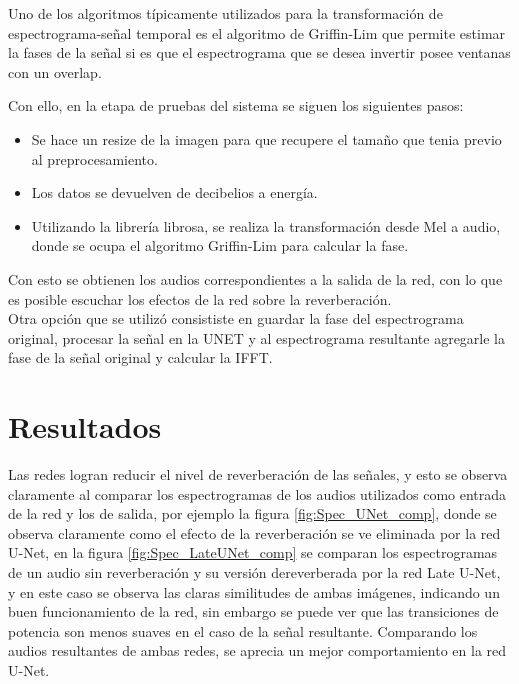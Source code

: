 Uno de los algoritmos típicamente utilizados para la transformación de espectrograma-señal temporal es el algoritmo de Griffin-Lim que permite estimar la fases de la señal si es que el espectrograma que se desea invertir posee ventanas con un overlap.


Con ello, en la etapa de pruebas del sistema se siguen los siguientes pasos:
\begin{itemize}
    \item Se hace un resize de la imagen para que recupere el tamaño que tenia previo al preprocesamiento. 
    \item Los datos se devuelven de decibelios a energía.
    \item Utilizando la librería librosa, se realiza la transformación desde Mel a audio, donde se ocupa el algoritmo Griffin-Lim para calcular la fase.
\end{itemize}

Con esto se obtienen los audios correspondientes a la salida de la red, con lo que es posible escuchar los efectos de la red sobre la reverberación.\\


Otra opción que se utilizó consististe en guardar la fase del espectrograma original, procesar la señal en la UNET y al espectrograma resultante agregarle la fase de la señal original y calcular la IFFT.



\section{Resultados}
Las redes logran reducir el nivel de reverberación de las señales, y esto se observa claramente al comparar los espectrogramas de los audios utilizados como entrada de la red y los de salida, por ejemplo la figura \ref{fig:Spec_UNet_comp}, donde se observa claramente como el efecto de la reverberación se ve eliminada por la red U-Net, en la figura \ref{fig:Spec_LateUNet_comp} se comparan los espectrogramas de un audio sin reverberación y su versión dereverberada por la red Late U-Net, y en este caso se observa las claras similitudes de ambas imágenes, indicando un buen funcionamiento de la red, sin embargo se puede ver que las transiciones de potencia son menos suaves en el caso de la señal resultante.
Comparando los audios resultantes de ambas redes, se aprecia un mejor comportamiento en la red U-Net.\\



